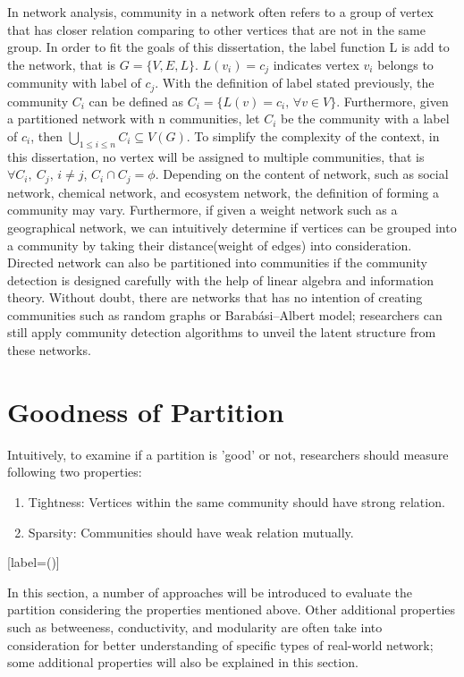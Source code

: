 \documentclass[12pt]{article}
\begin{document}
In network analysis, community in a network often refers to a group of vertex that has closer relation comparing to other vertices that are not in the same group. In order to fit the goals of this dissertation, the label function L is add to the network, that is $G = \{V,E,L\}$. $L(v_i) = c_j$ indicates vertex $v_i$ belongs to community with label of $c_j$. With the definition of label stated previously, the community $C_i$ can be defined as $C_i = \{ L(v) = c_i \text{, } \forall v \in V \}$. Furthermore, given a partitioned network with n communities, let $C_i$ be the community with a label of $c_i$, then $\bigcup_{1 \leq i \leq n} C_i \subseteq V(G)$.  To simplify the complexity of the context, in this dissertation, no vertex will be assigned to multiple communities, that is $\forall C_i,\ C_j \text{, } i \neq j$, $C_i \cap C_j = \phi$. Depending on the content of network, such as social network, chemical network, and ecosystem network, the definition of forming a community may vary. Furthermore, if given a weight network such as a geographical network, we can intuitively determine if vertices can be grouped into a community by taking their distance(weight of edges) into consideration. Directed network can also be partitioned into communities if the community detection is designed carefully with the help of linear algebra and information theory\cite{4}. Without doubt, there are networks that has no intention of creating communities such as random graphs or Barabási–Albert model\cite{5}; researchers can still apply community detection algorithms to unveil the latent structure from these networks.

\section{Goodness of Partition}

Intuitively, to examine if a partition is 'good' or not, researchers should measure following two properties: 
\begin{enumerate}[label=(\alph*)]
\item Tightness: Vertices within the same community should have strong relation.
\item Sparsity: Communities should have weak relation mutually.
\end{enumerate}[label=(\alph*)]

In this section, a number of approaches will be introduced to evaluate the partition considering the properties mentioned above. Other additional properties such as betweeness, conductivity, and modularity are often take into consideration for better understanding of specific types of real-world network\cite{7,8}; some additional properties will also be explained in this section.
\end{document}
